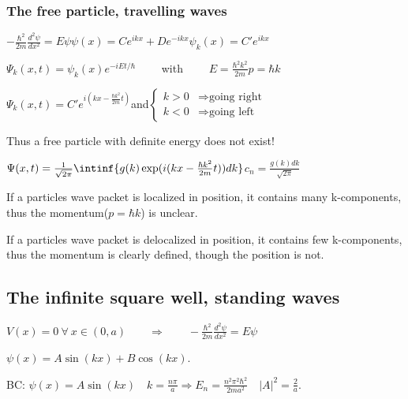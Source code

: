 \documentclass[10pt,a4paper]{scrartcl}
\begin{document}
\begin{multicols*}{3}
	\subsubsection{The free particle, travelling waves}
	
	$-\frac{\hbar^2}{2m}\frac{d^2\psi}{dx^2}=E\psi$\hfill$\psi(x)=Ce^{ikx}+De^{-ikx}$\hfill$\psi_k(x)=C'e^{ikx}$
	
	$\Psi_k(x,t)=\psi_k(x)e^{-iEt/\hbar}\qquad$ with $\qquad E=\frac{\hbar^2k^2}{2m}$\hfill$p=\hbar k$
	
	$\Psi_k(x,t)=C'e^{i(kx-\frac{\hbar k^2}{2m}t)}$\hfill and\hfill $\begin{cases}
	k>0&\Rightarrow\text{going right}\\
	k<0&\Rightarrow\text{going left}	
	\end{cases}$
	
	\finn
	
	\begin{center}
	
	Thus a free particle with definite energy does not exist!
	\end{center}
	
	$\Psi(x,t)=\frac{1}{\sqrt{2\pi}}\intinf{g(k)\exp(i(kx-\frac{\hbar k^2 }{2m}t))dk}$\hfill$c_n=\frac{g(k)dk}{\sqrt{2\pi}}$
	
	
	\footnotesize
	\normalsize
	
	If a particles wave packet is localized in position, it contains many k-components, thus the momentum($p=\hbar k$) is unclear.
	
	If a particles wave packet is delocalized in position, it contains few k-components, thus the momentum is clearly defined, though the position is not.
	
	\subsection{The infinite square well, standing waves}
	
	$V(x) = 0\ \forall\ x\in(0,a)
	\qquad \Rightarrow \qquad -\frac{\hbar^2}{2m}\frac{d^2\psi}{dx^2}=E\psi$
	
	$\psi(x)=A\sin(kx)+B\cos(kx)$.
	
	BC: $\psi(x) = A\sin(kx)\quad k=\frac{n\pi}{a}\Rightarrow E_n=\frac{n^2\pi^2\hbar^2}{2ma^2}\quad|A|^2=\frac{2}{a}$.
	

\end{multicols*}
\end{document}
